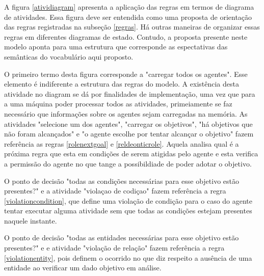 
A figura \ref{atividiagram} apresenta a aplicação das regras em termos de diagrama de atividades. Essa figura deve ser entendida como uma proposta de orientação das regras registradas na subseção \ref{regras}. Há outras maneiras de organizar 
essas regras em diferentes diagramas de estado. Contudo, a proposta presente neste modelo aponta para uma estrutura que corresponde as espectativas das semânticas do vocabulário aqui proposto.

O primeiro termo desta figura corresponde a "carregar todos os agentes". Esse elemento é indiferente a estrutura das regras do modelo. A existência desta atividade no diagram se dá por finalidades de implementação, uma vez que para a 
uma máquina poder processar todos as atividades, primeiamente se faz necessário que informações sobre os agentes sejam carregadas na memória. As atividades "selecione um dos agentes", "carregar os objetivos", "há objetivos 
que não foram alcançados" e "o agente escolhe por tentar alcançar o objetivo" fazem referência as regras \ref{rolenextgoal} e \ref{reldeonticrole}. Aquela analisa qual é a próxima regra que esta em condições de serem atigidas pelo agente e esta verifica a permissão do agente 
no que tange a possibildiade de poder adotar o objetivo. 

O ponto de decisão "todas as condições necessárias para esse objetivo estão presentes?" e a atividade "violaçao de codiçao" fazem referência a regra \ref{violationcondition}, que define uma violação de condição para o caso do agente tentar executar 
alguma atividade sem que todas as condições estejam presentes naquele instante.

O ponto de decisão "todas as entidades necessárias para esse objetivo estão presentes?" e e atividade "violação de relação" fazem referência a regra \ref{violationentity}, pois definem o ocorrido no que diz respeito a ausência de uma entidade 
ao verificar um dado objetivo em análise. 

